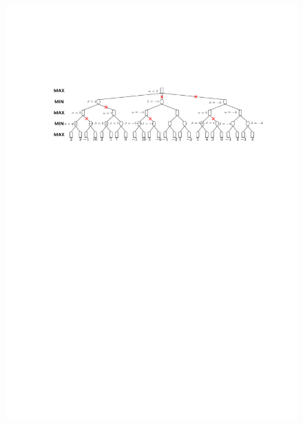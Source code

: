 \begin{example}
    \begin{figure}[htbp]
        \centering
        \includegraphics[width = .86\textwidth]{image/alpha-beta-sol.pdf}
    \end{figure}
\end{example}